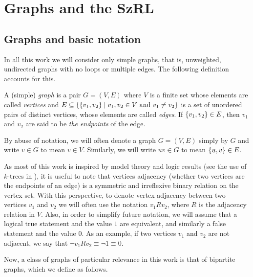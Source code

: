 \section{Graphs and the SzRL} \label{sec:section_2}

    \subsection{Graphs and basic notation} \label{subsec:subsection_2.1}

        In all this work we will consider only simple graphs, that is, unweighted, undirected graphs with no loops or
        multiple edges.
        The following definition accounts for this.

        \begin{definition}
            A (simple) \emph{graph} is a pair $G = (V, E)$ where $V$ is a finite set whose elements are called \emph{vertices}
            and $E \subseteq \{ \{ v_1, v_2 \} \mid v_1, v_2 \in V \text{ and } v_1 \neq v_2 \}$ is a set of
            unordered pairs of distinct vertices, whose elements are called \emph{edges}.
            If $\{ v_1, v_2 \} \in E$, then $v_1$ and $v_2$ are said to be \emph{the endpoints} of the edge.
        \end{definition}

        By abuse of notation, we will often denote a graph $G = (V, E)$ simply by $G$ and write $v \in G$ to mean $v \in V$.
        Similarly, we will write $u v \in G$ to mean $\{ u, v \} \in E$.

        As most of this work is inspired by model theory and logic results (see the use of $k$-trees in
        ), it is useful to note that vertices adjacency
        (whether two vertices are the endpoints of an edge) is a symmetric and irreflexive binary relation on the
        vertex set.
        With this perspective, to denote vertex adjacency between two vertices $v_1$ and $v_2$ we will often use the
        notation $v_1 R v_2$, where $R$ is the adjacency relation in $V$.
        Also, in order to simplify future notation, we will assume that a logical true statement and the value $1$ are
        equivalent, and similarly a false statement and the value $0$.
        As an example, if two vertices $v_1$ and $v_2$ are not adjacent, we say that
        $\neg v_1 R v_2 \equiv \neg 1 \equiv 0$.

        Now, a class of graphs of particular relevance in this work is that of bipartite graphs, which we define as
        follows.

